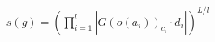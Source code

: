\documentclass[preview]{standalone}
\begin{document}
\begin{align*}
s(g) = \left(\prod_{i=1}^{l}\left|G(o(a_i))_{c_i}\cdot d_i\right|\right)^{L/l}
\end{align*}
\end{document}

